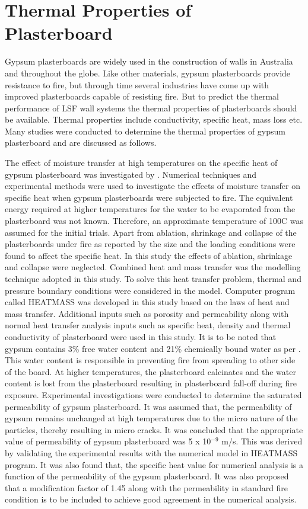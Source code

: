 \section{Thermal Properties of Plasterboard}
Gypsum plasterboards are widely used in the construction of walls in Australia and throughout the globe. Like other materials, gypsum plasterboards provide resistance to fire, but through time several industries have come up with improved plasterboards capable of resisting fire. But to predict the thermal performance of LSF wall systems the thermal properties of plasterboards should be available. Thermal properties include conductivity, specific heat, mass loss etc. Many studies were conducted to determine the thermal properties of gypsum plasterboard and are discussed as follows.

The effect of moisture transfer at high temperatures on the specific heat of gypsum plasterboard was investigated by \citet{Ang2009}. Numerical techniques and experimental methods were used to investigate the effects of moisture transfer on specific heat when gypsum plasterboards were subjected to fire. The equivalent energy required at higher temperatures for the water to be evaporated from the plasterboard was not known. Therefore, an approximate temperature of 100\degree C was assumed for the initial trials. Apart from ablation, shrinkage and collapse of the plasterboards under fire as reported by \citet{Jones2001} the size and the loading conditions were found to affect the specific heat. In this study the effects of ablation, shrinkage and collapse were neglected. Combined heat and mass transfer was the modelling technique adopted in this study. To solve this heat transfer problem, thermal and pressure boundary conditions were considered in the model. Computer program called HEATMASS was developed in this study based on the laws of heat and mass transfer. Additional inputs such as porosity and permeability along with normal heat transfer analysis inputs such as specific heat, density and thermal conductivity of plasterboard were used in this study. It is to be noted that gypsum contains 3\% free water content and 21\% chemically bound water as per \citet{Mehaffey1994}. This water content is responsible in preventing fire from spreading to other side of the board. At higher temperatures, the plasterboard calcinates and the water content is lost from the plasterboard resulting in plasterboard fall-off during fire exposure. Experimental investigations were conducted to determine the saturated permeability of gypsum plasterboard. It was assumed that, the permeability of gypsum remains unchanged at high temperatures due to the micro nature of the particles, thereby resulting in micro cracks. It was concluded that the appropriate value of permeability of gypsum plasterboard was 5 x 10$^{-9}$ m/s. This was derived by validating the experimental results with the numerical model in HEATMASS program. It was also found that, the specific heat value for numerical analysis is a function of the permeability of the gypsum plasterboard. It was also proposed that a modification factor of 1.45 along with the permeability in standard fire condition is to be included to achieve good agreement in the numerical analysis. 

